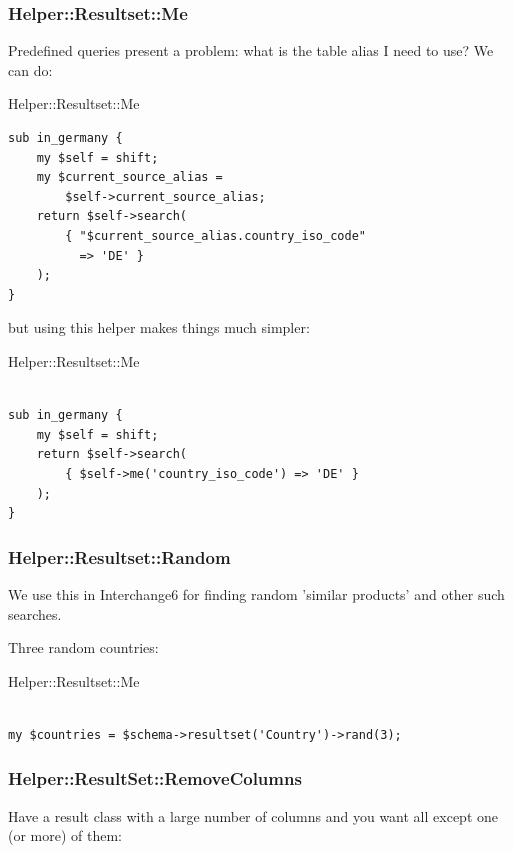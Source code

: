 \subsubsection{Helper::Resultset::Me}

Predefined queries present a problem: what is the table alias I need to use?
We can do:

\begin{frame}[fragile]{Helper::Resultset::Me}
\begin{lstlisting}
sub in_germany {
    my $self = shift;
    my $current_source_alias =
        $self->current_source_alias;
    return $self->search(
        { "$current_source_alias.country_iso_code"
          => 'DE' }
    );
}
\end{lstlisting}
\end{frame}

but using this helper makes things much simpler:

\begin{frame}[fragile]{Helper::Resultset::Me}
\begin{lstlisting}

sub in_germany {
    my $self = shift;
    return $self->search(
        { $self->me('country_iso_code') => 'DE' }
    );
}

\end{lstlisting}
\end{frame}

\subsubsection{Helper::Resultset::Random}

We use this in Interchange6 for finding random 'similar products' and other
such searches.

Three random countries:

\begin{frame}[fragile]{Helper::Resultset::Me}
\begin{lstlisting}

my $countries = $schema->resultset('Country')->rand(3);

\end{lstlisting}
\end{frame}

\subsubsection{Helper::ResultSet::RemoveColumns}
Have a result class with a large number of columns and you want all except
one (or more) of them:

